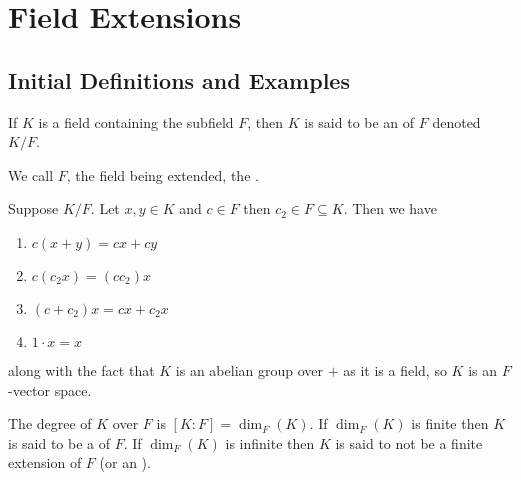 \documentclass[12pt, a4paper, twoside, openright, titlepage]{book}
\begin{document}
\chapter{\textsection\textsection Field Extensions}

\section{\textsection Initial Definitions and Examples}

\begin{defn}{}{}
    If $K$ is a field containing the subfield $F$, then $K$ is said to be an  of $F$ denoted $K/F$.
        \begin{center}
        \end{center}
    We call $F$, the field being extended, the .
\end{defn}

\begin{rmk}{}{}
    Suppose $K/F$. Let $x,y \in K$ and $c \in F$ then $c_2 \in F \subseteq K$. Then we have \begin{enumerate}
        \item $c(x+y) = cx+cy$
        \item $c(c_2x) = (cc_2)x$
        \item $(c+c_2)x = cx+c_2x$
        \item $1\cdot x = x$
    \end{enumerate}
    along with the fact that $K$ is an abelian group over $+$ as it is a field, so $K$ is an $F$-vector space.
\end{rmk}


\begin{defn}{}{}
    The degree of $K$ over $F$ is $[K:F] = \dim_F(K)$. If $\dim_F(K)$ is finite then $K$ is said to be a  of $F$. If $\dim_F(K)$ is infinite then $K$ is said to not be a finite extension of $F$ (or an ).
\end{defn}
\end{document}
